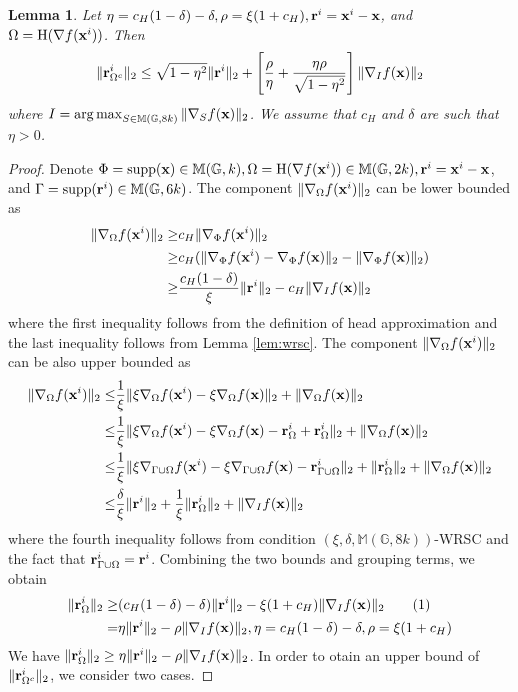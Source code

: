 \documentclass{article}
\DeclareMathOperator*{\argmax}{arg\,max}
\newcommand\numberthis{\addtocounter{equation}{1}\tag{\theequation}}
\newtheorem{lemma}{Lemma}
\begin{document}
\begin{lemma}\label{lem:omegac}
Let $\eta=c_H(1-\delta)-\delta,\rho=\xi(1+c_H), {\bf r}^i={\bf x}^i-{\bf x}$, and $\Omega=\mathrm{H}(\nabla f({\bf x}^i))$. Then
\begin{equation}\label{eq:romegac}
\|{\bf r}_{\Omega^c}^i\|_2\leq\sqrt{1-\eta^2}\|{\bf r}^i\|_2+\left[\frac{\rho}{\eta} +\frac{\eta\rho}{\sqrt{1-\eta^2}}\right]\|\nabla_I f({\bf x})\|_2
\end{equation}
where $I=\argmax_{S\in\mathbb{M}(\mathbb{G},8k)}\|\nabla_S f({\bf x})\|_2$. We assume that $c_H$ and $\delta$ are such that $\eta>0$.
\end{lemma}

\begin{proof}
Denote $\Phi=\mathrm{supp}({\bf x})\in\mathbb{M}(\mathbb{G},k),\Omega=\mathrm{H}(\nabla f({\bf x}^i))\in\mathbb{M}(\mathbb{G},2k),{\bf r}^i={\bf x}^i-{\bf x}$, and $\Gamma=\mathrm{supp}({\bf r}^i)\in\mathbb{M}(\mathbb{G},6k)$. The component $\|\nabla_{\Omega} f({\bf x}^i)\|_2$ can be lower bounded as
\begin{align*}
\|\nabla_{\Omega} f({\bf x}^i)\|_2\geq& c_H\|\nabla_{\Phi}f({\bf x}^i)\|_2\\
\geq&c_H(\|\nabla_{\Phi}f({\bf x}^i)-\nabla_{\Phi}f({\bf x}) \|_2-\|\nabla_{\Phi} f({\bf x})\|_2)\\
\geq&\frac{c_H(1-\delta)}{\xi}\|{\bf r}^i\|_2-c_H\|\nabla_I f({\bf x})\|_2
\end{align*}
where the first inequality follows from the definition of head approximation and the last inequality follows from Lemma \ref{lem:wrsc}. The component $\|\nabla_{\Omega} f({\bf x}^i)\|_2$ can be also upper bounded as
\begin{align*}
\|\nabla_{\Omega} f({\bf x}^i)\|_2\leq&\frac{1}{\xi}\|\xi\nabla_{\Omega}f({\bf x}^i)-\xi\nabla_{\Omega}f({\bf x})\|_2+\|\nabla_{\Omega}f({\bf x})\|_2\\
\leq&\frac{1}{\xi}\|\xi\nabla_{\Omega}f({\bf x}^i)-\xi\nabla_{\Omega}f({\bf x})-{\bf r}_{\Omega}^i+{\bf r}_{\Omega}^i\|_2+\|\nabla_{\Omega}f({\bf x})\|_2\\
\leq&\frac{1}{\xi}\|\xi\nabla_{\Gamma\cup\Omega}f({\bf x}^i)-\xi\nabla_{\Gamma\cup\Omega} f({\bf x})-{\bf r}_{\Gamma\cup\Omega}^i\|_2+\|{\bf r}_{\Omega}^i\|_2+\|\nabla_{\Omega}f({\bf x})\|_2\\
\leq&\frac{\delta}{\xi}\|{\bf r}^i\|_2+\frac{1}{\xi}\|{\bf r}_{\Omega}^i\|_2+\|\nabla_I f({\bf x})\|_2
\end{align*}
where the fourth inequality follows from condition $(\xi,\delta,\mathbb{M}(\mathbb{G},8k))$-WRSC and the fact that ${\bf r}_{\Gamma\cup\Omega}^i={\bf r}^i$. Combining the two bounds and grouping terms, we obtain
\begin{align*}
\|{\bf r}_{\Omega}^i\|_2\geq&(c_H(1-\delta)-\delta)\|{\bf r}^i\|_2-\xi(1+c_H)\|\nabla_I f({\bf x})\|_2\numberthis\label{eq:romega}\\
=&\eta\|{\bf r}^i\|_2-\rho\|\nabla_I f({\bf x})\|_2, \eta=c_H(1-\delta)-\delta, \rho=\xi(1+c_H)
\end{align*}
We have $\|{\bf r}_{\Omega}^i\|_2\geq\eta\|{\bf r}^i\|_2-\rho\|\nabla_I f({\bf x})\|_2$. In order to otain an upper bound of $\|{\bf r}_{\Omega^c}^i\|_2$, we consider two cases.


\end{proof}
\end{document}
